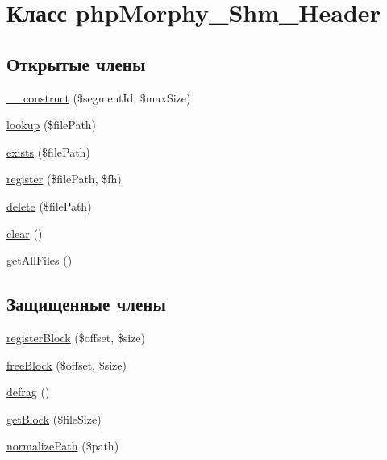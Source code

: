 \hypertarget{classphpMorphy__Shm__Header}{
\section{Класс phpMorphy\_\-Shm\_\-Header}
\label{classphpMorphy__Shm__Header}
}
\subsection*{Открытые члены}
\begin{DoxyCompactItemize}
\item 
\hyperlink{classphpMorphy__Shm__Header_a6f3e2d88e90cb3d8f93a4576ba2f441b}{\_\-\_\-construct} (\$segmentId, \$maxSize)
\item 
\hyperlink{classphpMorphy__Shm__Header_a17a08fae7242e573f770c0023eb31ea4}{lookup} (\$filePath)
\item 
\hyperlink{classphpMorphy__Shm__Header_a8d8c1181d53cd84446589a54f6fe8654}{exists} (\$filePath)
\item 
\hyperlink{classphpMorphy__Shm__Header_adaa6a4c38e2e664cd7f96af927b7e9b7}{register} (\$filePath, \$fh)
\item 
\hyperlink{classphpMorphy__Shm__Header_a8a85c78c33a9883d0dfea3dd5ab8ea72}{delete} (\$filePath)
\item 
\hyperlink{classphpMorphy__Shm__Header_a9017ef0cf4ba5556940f077ef64ffe34}{clear} ()
\item 
\hyperlink{classphpMorphy__Shm__Header_accdf5f9f57e064c8d90b59902a00c401}{getAllFiles} ()
\end{DoxyCompactItemize}
\subsection*{Защищенные члены}
\begin{DoxyCompactItemize}
\item 
\hyperlink{classphpMorphy__Shm__Header_a6ff2a0a89b5d7ad76a817a74f6c8523b}{registerBlock} (\$offset, \$size)
\item 
\hyperlink{classphpMorphy__Shm__Header_a2e722c26039fe2ce0184aa9dc165b97e}{freeBlock} (\$offset, \$size)
\item 
\hyperlink{classphpMorphy__Shm__Header_a50347b319e3ddb2d065599e5d3004a29}{defrag} ()
\item 
\hyperlink{classphpMorphy__Shm__Header_a968d64a36f51473454fba5f30284dac4}{getBlock} (\$fileSize)
\item 
\hyperlink{classphpMorphy__Shm__Header_a909ab38902b0265f1d98642ff33552fe}{normalizePath} (\$path)
\end{DoxyCompactItemize}
